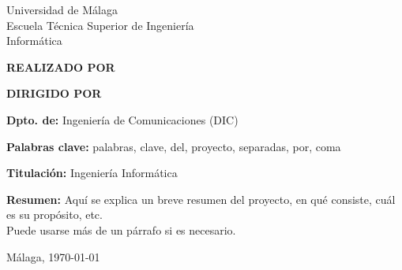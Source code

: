 
\thispagestyle{empty}
\begin{center}
  \Large \sffamily
  Universidad de Málaga\\
  Escuela Técnica Superior de Ingeniería \\
  Informática
\end{center}

\bigskip

\begin{center}
  \Huge\scshape
  \pfctitlename
\end{center}

\bigskip

\begin{center}
  \textbf{REALIZADO POR}\\
  \textsf{\pfcauthorname}
\end{center}

\medskip

\begin{center}
  \textbf{DIRIGIDO POR}\\
  \textsf{\pfctutorname}
\end{center}

\vfill

\begin{minipage}{\textwidth}
\textbf{Dpto. de:} Ingeniería de Comunicaciones (DIC)

\medskip

\textbf{Palabras clave:} palabras, clave, del, proyecto, separadas, por, coma

\medskip

\textbf{Titulación:} Ingeniería Informática

\medskip

\textbf{Resumen:}
  Aquí se explica un breve resumen del proyecto, en qué consiste, cuál es
su propósito, etc.\\
  Puede usarse más de un párrafo si es necesario.

\begin{center} Málaga, \today\end{center}
\end{minipage}

\blankpage
